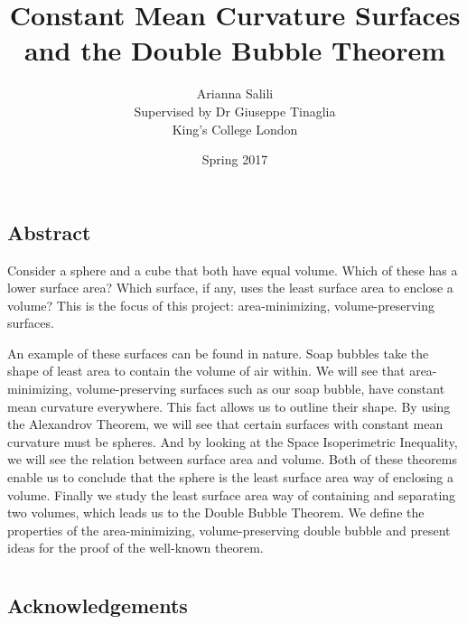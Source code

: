\documentclass[a4paper,12pt]{report}
\begin{document}
\title{Constant Mean Curvature Surfaces and the Double Bubble Theorem}
\author{ Arianna Salili \\ Supervised by Dr Giuseppe Tinaglia \\ King's College London}
\date{Spring 2017}


\maketitle

\chapter*{ }

\section*{Abstract}

Consider a sphere and a cube that both have equal volume. Which of these has a lower surface area? Which surface, if any, uses the least surface area to enclose a volume? This is the focus of this project: area-minimizing, volume-preserving surfaces.\par 
\hspace{-0.66cm}An example of these surfaces can be found in nature. Soap bubbles take the shape of least area to contain the volume of air within. We will see that area-minimizing, volume-preserving surfaces such as our soap bubble, have constant mean curvature everywhere. This fact allows us to outline their shape. By using the Alexandrov Theorem, we will see that certain surfaces with constant mean curvature must be spheres. And  by looking at the Space Isoperimetric Inequality, we will see the relation between surface area and volume. Both of these theorems enable us to conclude that the sphere is the least surface area way of enclosing a volume. Finally we study the least surface area way of containing and separating two volumes, which leads us to the Double Bubble Theorem. We define the properties of the area-minimizing, volume-preserving double bubble and present ideas for the proof of the well-known theorem.


\chapter*{ }
\section*{Acknowledgements}
\end{document}
